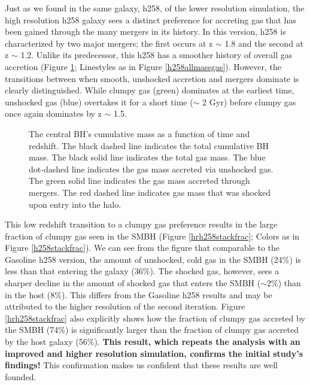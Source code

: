 \documentclass[12pt,headA,chapB]{fiskthesis}
\begin{document}
Just as we found in the same galaxy, h258, of the lower resolution simulation, the high resolution h258 galaxy sees a distinct preference for accreting gas that has been gained through the many mergers in its history. In this version, h258 is characterized by two major mergers; the first occurs at z $\sim$ 1.8 and the second at z $\sim$ 1.2. Unlike its predecessor, this h258 has a smoother history of overall gas accretion (Figure \ref{hrh258allmassgas}; Linestyles as in Figure \ref{h258allmassgas}). However, the transitions between when smooth, unshocked accretion and mergers dominate is clearly distinguished. While clumpy gas (green) dominates at the earliest time, unshocked gas (blue) overtakes it for a short time ($\sim$ 2 Gyr) before clumpy gas once again dominates by z $\sim$ 1.5. 

\begin{figure} [h]
\centerline{}
\caption[ChaNGa h258 SMBH Cumulative Mass]{The central BH’s cumulative mass as a function of time and redshift. The black dashed line indicates the total cumulative BH mass. The black solid line indicates the total gas mass. The blue dot-dashed line indicates the gas mass accreted via unshocked gas. The green solid line indicates the gas mass accreted through mergers. The red dashed line indicates gas mass that was shocked upon entry into the halo.}
\label{hrh258allmassgas} 
\end{figure}

This low redshift transition to a clumpy gas preference results in the large fraction of clumpy gas seen in the SMBH (Figure \ref{hrh258stackfrac}; Colors as in Figure \ref{h258stackfrac}). We can see from the figure that comparable to the Gasoline h258 version, the amount of unshocked, cold gas in the SMBH (24\%) is less than that entering the galaxy (36\%). The shocked gas, however, sees a sharper decline in the amount of shocked gas that enters the SMBH ($\sim$2\%) than in the host (8\%). This differs from the Gasoline h258 results and may be attributed to the higher resolution of the second iteration. Figure \ref{hrh258stackfrac} also explicitly shows how the fraction of clumpy gas accreted by the SMBH (74\%) is significantly larger than the fraction of clumpy gas accreted by the host galaxy (56\%).  \textbf{This result, which repeats the analysis with an improved and higher resolution simulation, confirms the initial study's findings!} This confirmation makes us confident that these results are well founded. 
\end{document}
